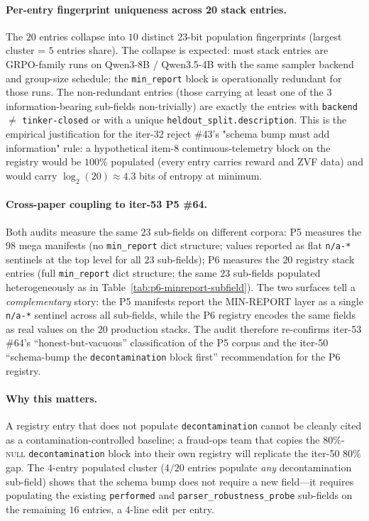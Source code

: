 \paragraph{Per-entry fingerprint uniqueness across 20 stack entries.}
The $20$ entries collapse into $10$ distinct $23$-bit population
fingerprints (largest cluster = $5$ entries share). The collapse is
expected: most stack entries are GRPO-family runs on Qwen3-8B / Qwen3.5-4B
with the same sampler backend and group-size schedule; the
\texttt{min\_report} block is operationally redundant for those runs.
The non-redundant entries (those carrying at least one of the $3$
information-bearing sub-fields non-trivially) are exactly the entries
with \texttt{backend} $\ne$ \texttt{tinker-closed} or with a unique
\texttt{heldout\_split.description}. This is the empirical justification
for the iter-32 reject \#43's "schema bump must add information" rule:
a hypothetical item-$8$ continuous-telemetry block on the registry
would be $100\%$ populated (every entry carries reward and ZVF data)
and would carry $\log_2(20) \approx 4.3$ bits of entropy at minimum.

\paragraph{Cross-paper coupling to iter-53 P5 \#64.}
Both audits measure the same $23$ sub-fields on different corpora: P5
measures the $98$ mega manifests (no \texttt{min\_report} dict
structure; values reported as flat \texttt{n/a-*} sentinels at the
top level for all $23$ sub-fields); P6 measures the $20$ registry
stack entries (full \texttt{min\_report} dict structure; the same
$23$ sub-fields populated heterogeneously as in
Table~\ref{tab:p6-minreport-subfield}). The two surfaces tell a
\emph{complementary} story: the P5 manifests report the MIN-REPORT layer
as a single \texttt{n/a-*} sentinel across all sub-fields, while the
P6 registry encodes the same fields as real values on the $20$
production stacks. The audit therefore re-confirms iter-53 \#64's
``honest-but-vacuous'' classification of the P5 corpus and the iter-50
``schema-bump the \texttt{decontamination} block first''
recommendation for the P6 registry.

\paragraph{Why this matters.}
A registry entry that does not populate \texttt{decontamination} cannot
be cleanly cited as a contamination-controlled baseline; a fraud-ops
team that copies the $80\%$-\textsc{null} \texttt{decontamination}
block into their own registry will replicate the iter-50 $80\%$
gap. The $4$-entry populated cluster ($4/20$ entries populate
\emph{any} decontamination sub-field) shows that the schema bump does
not require a new field---it requires populating the existing
\texttt{performed} and \texttt{parser\_robustness\_probe} sub-fields
on the remaining $16$ entries, a $4$-line edit per entry.

